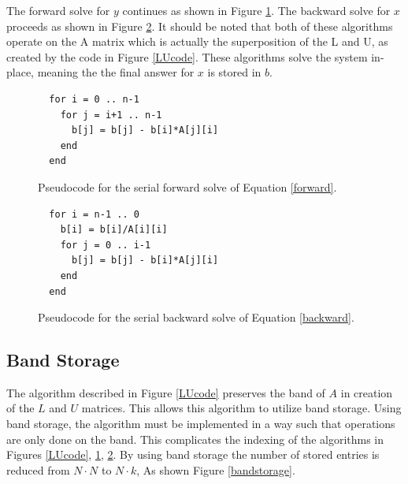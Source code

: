 \documentclass[12pt]{article}
\begin{document}
The forward solve for $y$ continues as shown in Figure \ref{forwardcode}. The
backward solve for $x$ proceeds as shown in Figure \ref{backwardcode}. It
should be noted that both of these algorithms operate on the A matrix which is
actually the superposition of the L and U, as created by the code in Figure \ref{LUcode}. 
These algorithms solve the system in-place, meaning the the final answer for $x$ is stored in $b$.

\begin{figure}[H]
\caption{Pseudocode for the serial forward solve of Equation \ref{forward}.}
\label{forwardcode}
\begin{lstlisting}
  for i = 0 .. n-1
    for j = i+1 .. n-1
      b[j] = b[j] - b[i]*A[j][i]
    end
  end
\end{lstlisting}
\end{figure}

\begin{figure}[H]
\caption{Pseudocode for the serial backward solve of Equation \ref{backward}.}
\label{backwardcode}
\begin{lstlisting}
  for i = n-1 .. 0
    b[i] = b[i]/A[i][i]
    for j = 0 .. i-1
      b[j] = b[j] - b[i]*A[j][i]
    end
  end
\end{lstlisting}
\end{figure}

\subsection{Band Storage}
\label{band}

The algorithm described in Figure \ref{LUcode} preserves the band of $A$ in
creation of the $L$ and $U$ matrices. This allows this algorithm to utilize
band storage. Using band storage, the algorithm must be implemented in a way
such that operations are only done on the band. This complicates the indexing
of the algorithms in Figures \ref{LUcode}, \ref{forwardcode},
\ref{backwardcode}.  By using band storage the number of stored entries is
reduced from $N \cdot N$ to $N \cdot k$, As shown Figure \ref{bandstorage}.
\end{document}
